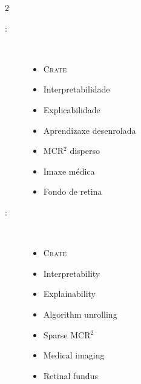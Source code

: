 \begin{multicols}{2}
\begin{description}
\item [\palabraschaveprincipal:] \mbox{} \\[-20pt]
\begin{itemize}
  \item \textsc{Crate}
  \item Interpretabilidade
  \item Explicabilidade
  \item Aprendizaxe desenrolada
  \item MCR$^2$ disperso
  \item Imaxe médica
  \item Fondo de retina
\end{itemize}
\end{description}
\begin{description}
\item [\palabraschavesecundaria:] \mbox{} \\[-20pt]
\begin{itemize}
  \item \textsc{Crate}
  \item Interpretability
  \item Explainability
  \item Algorithm unrolling
  \item Sparse MCR$^2$
  \item Medical imaging
  \item Retinal fundus
\end{itemize}
\end{description}
\end{multicols}
